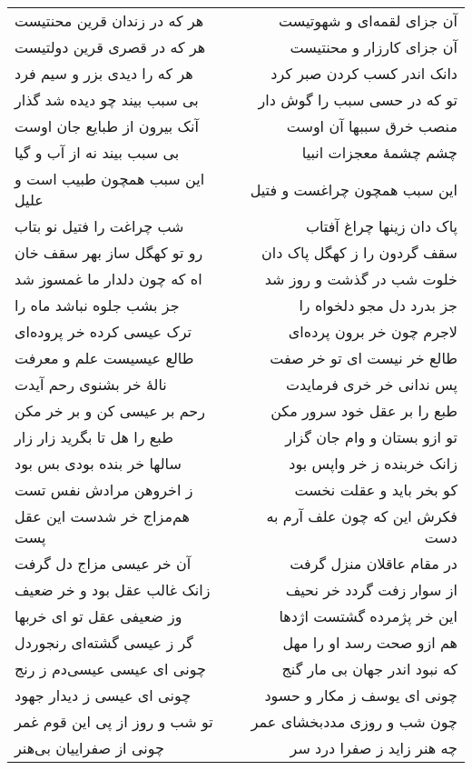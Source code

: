 \begin{center}
\begin{longtable}{l p{0.5cm} r}
هر که در زندان قرین محنتیست
&&
آن جزای لقمه‌ای و شهوتیست
\\
هر که در قصری قرین دولتیست
&&
آن جزای کارزار و محنتیست
\\
هر که را دیدی بزر و سیم فرد
&&
دانک اندر کسب کردن صبر کرد
\\
بی سبب بیند چو دیده شد گذار
&&
تو که در حسی سبب را گوش دار
\\
آنک بیرون از طبایع جان اوست
&&
منصب خرق سببها آن اوست
\\
بی سبب بیند نه از آب و گیا
&&
چشم چشمهٔ معجزات انبیا
\\
این سبب همچون طبیب است و علیل
&&
این سبب همچون چراغست و فتیل
\\
شب چراغت را فتیل نو بتاب
&&
پاک دان زینها چراغ آفتاب
\\
رو تو کهگل ساز بهر سقف خان
&&
سقف گردون را ز کهگل پاک دان
\\
اه که چون دلدار ما غمسوز شد
&&
خلوت شب در گذشت و روز شد
\\
جز بشب جلوه نباشد ماه را
&&
جز بدرد دل مجو دلخواه را
\\
ترک عیسی کرده خر پروده‌ای
&&
لاجرم چون خر برون پرده‌ای
\\
طالع عیسیست علم و معرفت
&&
طالع خر نیست ای تو خر صفت
\\
نالهٔ خر بشنوی رحم آیدت
&&
پس ندانی خر خری فرمایدت
\\
رحم بر عیسی کن و بر خر مکن
&&
طبع را بر عقل خود سرور مکن
\\
طبع را هل تا بگرید زار زار
&&
تو ازو بستان و وام جان گزار
\\
سالها خر بنده بودی بس بود
&&
زانک خربنده ز خر واپس بود
\\
ز اخروهن مرادش نفس تست
&&
کو بخر باید و عقلت نخست
\\
هم‌مزاج خر شدست این عقل پست
&&
فکرش این که چون علف آرم به دست
\\
آن خر عیسی مزاج دل گرفت
&&
در مقام عاقلان منزل گرفت
\\
زانک غالب عقل بود و خر ضعیف
&&
از سوار زفت گردد خر نحیف
\\
وز ضعیفی عقل تو ای خربها
&&
این خر پژمرده گشتست اژدها
\\
گر ز عیسی گشته‌ای رنجوردل
&&
هم ازو صحت رسد او را مهل
\\
چونی ای عیسی عیسی‌دم ز رنج
&&
که نبود اندر جهان بی مار گنج
\\
چونی ای عیسی ز دیدار جهود
&&
چونی ای یوسف ز مکار و حسود
\\
تو شب و روز از پی این قوم غمر
&&
چون شب و روزی مددبخشای عمر
\\
چونی از صفراییان بی‌هنر
&&
چه هنر زاید ز صفرا درد سر

\end{longtable}
\end{center}
